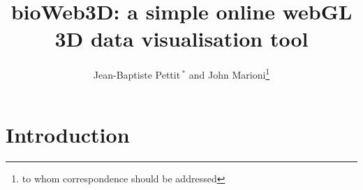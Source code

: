 \documentclass{bioinfo}
\begin{document}

\title[Supplementary for : Application Note]{bioWeb3D: a simple online webGL 3D data visualisation tool}
\author[Pettit \textit{et~al}]{Jean-Baptiste Pettit\,$^{*}$ and John Marioni\footnote{to whom correspondence should be addressed}}
\address{EMBL-EBI, European Molecular Biology Laboratory - European Bioinformatics Institute, Cambridge, CB10 1SD, UK}



\maketitle

\section{Introduction}
\end{document}
